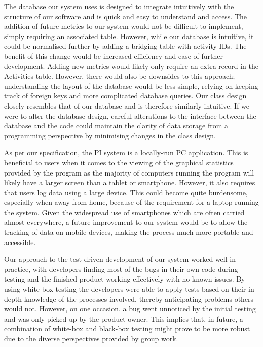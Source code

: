 \documentclass[12pt]{article}
\begin{document}
The database our system uses is designed to integrate intuitively with the 
structure of our software and is quick and easy to understand and access. The 
addition of future metrics to our system would not be difficult to implement, 
simply requiring an associated table. However, while our database is intuitive, 
it could be normalised further by adding a bridging table with 
activity IDs. The benefit of this change would be increased efficiency and 
ease of further development. Adding new metrics would likely only require an 
extra record in the Activities table. However, there would also be downsides 
to this approach; understanding the layout of the database would be less 
simple, relying on keeping track of foreign keys and more complicated database 
queries. Our class design closely resembles that of our database and is 
therefore similarly intuitive. If we were to alter the database design, 
careful alterations to the interface between the database and the code could 
maintain the clarity of data storage from a programming perspective by 
minimising changes in the class design.\par

As per our specification, the PI system is a locally-run PC application. This 
is beneficial to users when it comes to the viewing of the graphical statistics 
provided by the program as the majority of computers running the program will 
likely have a larger screen than a tablet or smartphone. However, it also 
requires that users log data using a large device. This could become quite 
burdensome, especially when away from home, because of the requirement for a 
laptop running the system. Given the widespread use of smartphones which are 
often carried almost everywhere, a future improvement to our system would be 
to allow the tracking of data on mobile devices, making the process much more 
portable and accessible.\par

Our approach to the test-driven development of our system worked well in 
practice, with developers finding most of the bugs in their own code during 
testing and the finished product working effectively with no known issues. By 
using white-box testing the developers were able to apply tests based on their 
in-depth knowledge of the processes involved, thereby anticipating problems 
others would not. However, on one occasion, a bug went unnoticed by the initial 
testing and was only picked up by the product owner. This implies that, in 
future, a combination of white-box and black-box testing might prove to be more 
robust due to the diverse perspectives provided by group work.\par  
\end{document}
